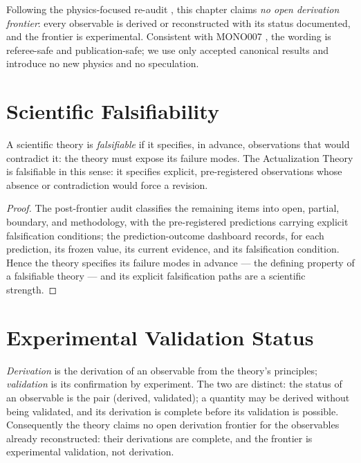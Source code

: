 Following the physics-focused re-audit \cite{c14:MONO110A}, this chapter claims \emph{no open
derivation frontier}: every observable is derived or reconstructed with its status
documented, and the frontier is experimental.
Consistent with MONO007 \cite{c14:MONO007}, the wording is referee-safe and publication-safe;
we use only accepted canonical results and introduce no new physics and no speculation.

\section{Scientific Falsifiability}
\label{c14:sec:falsifiability}

\begin{theorem}
\label{c14:thm:falsifiability}
A scientific theory is \emph{falsifiable} if it specifies, in advance, observations that
would contradict it: the theory must expose its failure modes. The Actualization Theory is
falsifiable in this sense: it specifies explicit, pre-registered observations whose absence
or contradiction would force a revision.
\end{theorem}

\begin{proof}
The post-frontier audit \cite{c14:QG299} classifies the remaining items into open, partial,
boundary, and methodology, with the pre-registered predictions carrying explicit
falsification conditions; the prediction-outcome dashboard \cite{c14:QG202} records, for each
prediction, its frozen value, its current evidence, and its falsification condition. Hence
the theory specifies its failure modes in advance --- the defining property of a falsifiable
theory --- and its explicit falsification paths are a scientific strength.
\end{proof}

\section{Experimental Validation Status}
\label{c14:sec:validation-status}

\begin{theorem}
\label{c14:thm:derived-vs-validated}
\emph{Derivation} is the derivation of an observable from the theory's principles;
\emph{validation} is its confirmation by experiment. The two are distinct: the status of an
observable is the pair (derived, validated); a quantity may be derived without being
validated, and its derivation is complete before its validation is possible. Consequently
the theory claims no open derivation frontier for the observables already reconstructed:
their derivations are complete, and the frontier is experimental validation, not derivation.
\end{theorem}

